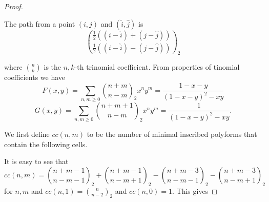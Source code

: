 \documentclass[12pt]{article}
\theoremstyle{plain}
\theoremstyle{definition}
\theoremstyle{remark}
\theoremstyle{definition}
\newcommand{\cellw}[4]{\draw[thick] ( #1 , #2 ) rectangle ( #3 , #4 );}
\newcommand{\cellb}[4]{\filldraw[black!60] ( #1 , #2 ) rectangle ( #3 , #4 ); \draw[thick] ( #1 , #2 ) rectangle ( #3 , #4 );}
\begin{document}
\begin{proof}
\begin{center}
\end{center}

The path from a point $(i,j)$ and $(\hat{i},\hat{j})$ is
$$\binom{\frac{1}{2}((i-\hat{i})+(j-\hat{j}))}{\frac{1}{2}((i-\hat{i})-(j-\hat{j}))}_2$$

where $\binom{n}{k}$ is the $n,k$-th trinomial coefficient. From properties of tinomial coefficients we have 
$$F(x,y)=\sum_{n,m\geq 0}\binom{n+m}{n-m}_2 x^n y^m = \frac{1-x-y}{(1-x-y)^2 -xy}$$
$$G(x,y)=\sum_{n,m\geq 0}\binom{n+m+1}{n-m}_2 x^n y^m = \frac{1}{(1-x-y)^2 -xy}.$$

We first define $cc(n,m)$ to be the number of minimal inscribed polyforms that contain the following cells.

\begin{center}
\end{center}

It is easy to see that $$cc(n,m)=\binom{n+m-1}{n-m-1}_2 +\binom{n+m-1}{n-m+1}_2 -\binom{n+m-3}{n-m-1}_2 -\binom{n+m-3}{n-m+1}_2$$
for $n,m$ and $cc(n,1)=\binom{n}{n-2}_2$ and $cc(n,0)=1$. This gives


\end{proof}
\end{document}
